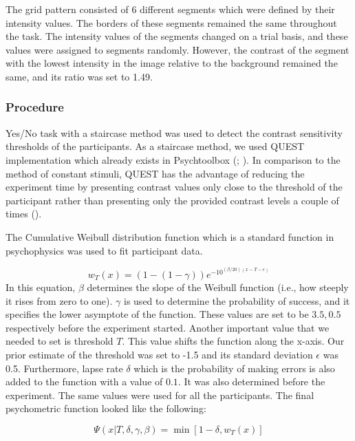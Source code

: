 \documentclass{article}
\begin{document}
The grid pattern consisted of 6 different segments which were defined by their intensity values. The borders of these segments remained the same throughout the task. The intensity values of the segments changed on a trial basis, and these values were assigned to segments randomly. However, the contrast of the segment with the lowest intensity in the image relative to the background remained the same, and its ratio was set to 1.49. 

\subsubsection{Procedure}
Yes/No task with a staircase method was used to detect the contrast sensitivity thresholds of the participants. As a staircase method, we used QUEST implementation which already exists in Psychtoolbox (\cite{watson1983quest}; \cite{psychtoolbox}). In comparison to the method of constant stimuli, QUEST has the advantage of reducing the experiment time by presenting contrast values only close to the threshold of the participant rather than presenting only the provided contrast levels a couple of times (\cite{pelli_psychophysics}). 

The Cumulative Weibull distribution function which is a standard function in psychophysics was used to fit participant data.

{\fontsize{12}{12}\selectfont
\begin{equation}
    w_T(x) = (1 - (1 - \gamma)) e^{-10^{(\beta / 20) (x - T - \epsilon)}}
\end{equation}
}
In this equation, $\beta$ determines the slope of the Weibull function (i.e., how steeply it rises from zero to one). $\gamma$ is used to determine the probability of success, and it specifies the lower asymptote of the function. These values are set to be $3.5, 0.5$ respectively before the experiment started. Another important value that we needed to set is threshold $T$. This value shifts the function along the x-axis. Our prior estimate of the threshold was set to -1.5 and its standard deviation $\epsilon$ was 0.5. Furthermore, lapse rate $\delta$ which is the probability of making errors is also added to the function with a value of $0.1$. It was also determined before the experiment. The same values were used for all the participants. The final psychometric function looked like the following:

\begin{equation}
    \Psi(x | T, \delta , \gamma, \beta) = \min[1 - \delta, w_T(x)]
\end{equation}
\end{document}
